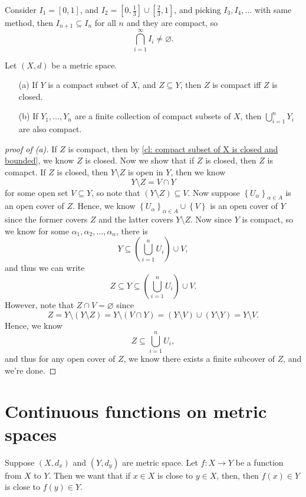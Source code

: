 \begin{eg}
    Consider \(I_1 = [0, 1]\), and \(I_2 = [0, \frac{1}{3}] \cup [\frac{2}{3}, 1]\), and picking \(I_3, I_4, \dots \) with same method, then \(I_{n+1} \subseteq I_n\) for all \(n\) and they are compact, so
    \[
        \bigcap_{i=1}^{\infty} I_i \neq \varnothing . 
    \]      
\end{eg}

\begin{theorem}
    Let \((X, d)\) be a metric space. 
    \begin{itemize}
        \item [(a)] If \(Y\) is a compact subset of \(X\), and \(Z \subseteq Y\), then \(Z\) is compact iff \(Z\) is closed.      
        \item [(b)] If \(Y_1, \dots , Y_n\) are a finite collection of compact subsets of \(X\), then \(\bigcup_{i=1}^{n} Y_i \) are also compact.   
    \end{itemize} 
\end{theorem}
\begin{proof}[proof of (a)]
    If \(Z\) is compact, then by \autoref{cl: compact subset of X is closed and bounded}, we know \(Z\) is closed. Now we show that if \(Z\) is closed, then \(Z\) is comapct. If \(Z\) is closed, then \(Y \setminus Z\) is open in \(Y\), then we know 
    \[
        Y \setminus Z = V \cap Y
    \] for some open set \(V \subseteq Y\), so note that \((Y \setminus Z) \subseteq V\). Now suppose \(\left\{ U_\alpha  \right\}_{\alpha \in A} \) is an open cover of \(Z\). Hence, we know \(\left\{ U_\alpha  \right\}_{\alpha \in A} \cup \left\{ V \right\}  \) is an open cover of \(Y\) since the former covers \(Z\) and the latter covers \(Y \setminus Z\). Now since \(Y\) is compact, so we know for some \(\alpha _1, \alpha _2, \dots , \alpha _n\), there is 
    \[
        Y \subseteq \left( \bigcup_{i=1}^{n} U_i \right) \cup V, 
    \] and thus we can write
    \[
        Z \subseteq Y \subseteq \left( \bigcup_{i=1}^{n} U_i  \right) \cup V. 
    \]  
    However, note that \(Z \cap V = \varnothing \) since
    \[
        Z = Y \setminus (Y \setminus Z) = Y \setminus (V \cap Y) = (Y \setminus V) \cup (Y \setminus Y) = Y \setminus V.
    \]
    Hence, we know 
    \[
        Z \subseteq \bigcup_{i=1}^{n} U_i, 
    \] and thus for any open cover of \(Z\), we know there exists a finite subcover of \(Z\), and we're done.
\end{proof}
\chapter{Continuous functions on metric spaces}
Suppose \((X, d_x)\) and \((Y, d_y)\) are metric space. Let \(f: X \to Y\) be a function from \(X\) to \(Y\). Then we want that if \(x \in X\) is close to \(y \in X\), then, then \(f(x)\in Y\) is close to \(f(y) \in Y\). 

